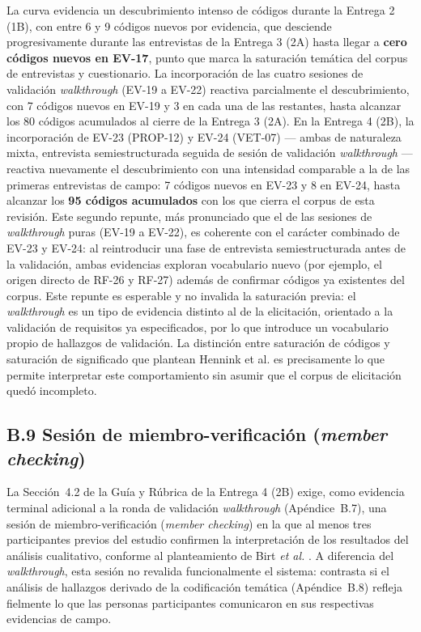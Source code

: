 \documentclass[journal,onecolumn]{IEEEtran}
\begin{document}
	La curva evidencia un descubrimiento intenso de códigos durante la Entrega 2
	(1B), con entre 6 y 9 códigos nuevos por evidencia, que desciende
	progresivamente durante las entrevistas de la Entrega 3 (2A) hasta llegar a
	\textbf{cero códigos nuevos en EV-17}, punto que marca la saturación
	temática del corpus de entrevistas y cuestionario. La incorporación de las
	cuatro sesiones de validación \emph{walkthrough} (EV-19 a EV-22) reactiva
	parcialmente el descubrimiento, con 7 códigos nuevos en EV-19 y 3 en cada
	una de las restantes, hasta alcanzar los 80 códigos acumulados al cierre de
	la Entrega 3 (2A). En la Entrega 4 (2B), la incorporación de EV-23
	(PROP-12) y EV-24 (VET-07) --- ambas de naturaleza mixta, entrevista
	semiestructurada seguida de sesión de validación \emph{walkthrough} ---
	reactiva nuevamente el descubrimiento con una intensidad comparable a la de
	las primeras entrevistas de campo: 7 códigos nuevos en EV-23 y 8 en EV-24,
	hasta alcanzar los \textbf{95 códigos acumulados} con los que cierra el
	corpus de esta revisión. Este segundo repunte, más pronunciado que el de
	las sesiones de \emph{walkthrough} puras (EV-19 a EV-22), es coherente con
	el carácter combinado de EV-23 y EV-24: al reintroducir una fase de
	entrevista semiestructurada antes de la validación, ambas evidencias
	exploran vocabulario nuevo (por ejemplo, el origen directo de RF-26 y
	RF-27) además de confirmar códigos ya existentes del corpus. Este repunte
	es esperable y no invalida la saturación previa: el \emph{walkthrough} es un
	tipo de evidencia distinto al de la elicitación, orientado a la validación
	de requisitos ya especificados, por lo que introduce un vocabulario propio
	de hallazgos de validación. La distinción entre saturación de códigos y
	saturación de significado que plantean Hennink et al. \cite{hennink2017} es
	precisamente lo que permite interpretar este comportamiento sin asumir que
	el corpus de elicitación quedó incompleto.
	
	\subsection*{B.9 Sesión de miembro-verificación (\emph{member checking})}
	\label{sec:memberchecking}

	La Sección~4.2 de la Guía y Rúbrica de la Entrega 4 (2B) exige, como
	evidencia terminal adicional a la ronda de validación \emph{walkthrough}
	(Apéndice~B.7), una sesión de miembro-verificación (\emph{member
		checking}) en la que al menos tres participantes previos del estudio
	confirmen la interpretación de los resultados del análisis cualitativo,
	conforme al planteamiento de Birt \emph{et al.} \cite{birt2016}. A
	diferencia del \emph{walkthrough}, esta sesión no revalida funcionalmente
	el sistema: contrasta si el análisis de hallazgos derivado de la
	codificación temática (Apéndice~B.8) refleja fielmente lo que las
	personas participantes comunicaron en sus respectivas evidencias de
	campo.
\end{document}
